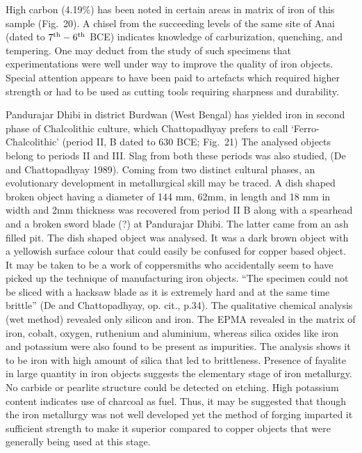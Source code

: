 High carbon (4.19\%) has been noted in certain areas in matrix of iron of this sample (Fig.~20).  A chisel from the succeeding levels of the same site of Anai (dated to $7^{\rm th}-6^{\rm th}$ BCE) indicates knowledge of carburization, quenching, and tempering. One may deduct from  the study of such specimens that experimentations were well under way to improve the quality of iron objects. Special attention appears to have been paid to artefacts which required higher strength or had to be used as cutting tools requiring sharpness and durability. 
 
Pandurajar Dhibi in district Burdwan (West Bengal) has yielded iron in second phase of Chalcolithic culture, which Chattopadhyay prefers to call ‘Ferro-Chalcolithic’ (period II, B dated to 630 BCE; Fig.~21)  The analysed objects belong to periods II and III. Slag from both these periods was also studied, (De and Chattopadhyay 1989). Coming from two distinct cultural phases, an evolutionary development in metallurgical skill may be traced. A dish shaped broken object having a diameter of 144 mm, 62mm, in length and 18 mm in width and 2mm thickness was recovered from period II B along with a spearhead and a broken sword blade (?) at Pandurajar Dhibi. The latter came from an ash filled pit. The dish shaped object was analysed. It was a dark brown object with a yellowish surface colour that could easily be confused for copper based object. It may be taken to be a work of coppersmiths who accidentally seem to have picked up the technique of manufacturing iron objects. “The specimen could not be sliced with a hacksaw blade as it is extremely hard and at the same time brittle” (De and Chattopadhyay, op. cit., p.34). The qualitative chemical analysis (wet method) revealed only silicon and iron. The EPMA revealed in the matrix of iron, cobalt, oxygen, ruthenium and aluminium, whereas silica oxides like iron and potassium were also found to be present as impurities. The analysis shows it to be iron with high amount of silica that led to brittleness. Presence of fayalite in large quantity in iron objects suggests the elementary stage of iron metallurgy. No carbide or pearlite structure could be detected on etching. High potassium content indicates use of charcoal as fuel. Thus, it may be suggested that though the iron metallurgy was not well developed yet the method of forging imparted it sufficient strength to make it superior compared to copper objects that were generally being used at this stage.

